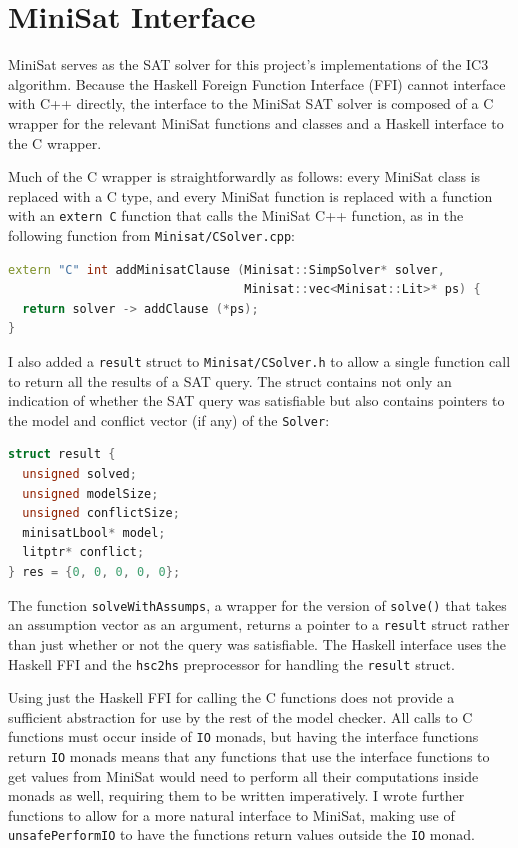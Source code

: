 \documentclass[12pt,a4paper,twoside,openright]{report}
\begin{document}
{\section{MiniSat Interface}
\label{impl:minisat}

MiniSat serves as the SAT solver for this project's implementations of the IC3 algorithm.
Because the Haskell Foreign Function Interface (FFI) cannot interface with C++ directly,
the interface to the MiniSat SAT solver is composed of a C wrapper for the relevant
MiniSat functions and classes and a Haskell interface to the C wrapper.

Much of the C wrapper is straightforwardly as follows:
every MiniSat class is replaced with a C
type, and every MiniSat function is replaced with a function with an \verb,extern C, function that
calls the MiniSat C++ function, as in the following function
from \verb,Minisat/CSolver.cpp,:
\begin{lstlisting}[language = C++]
extern "C" int addMinisatClause (Minisat::SimpSolver* solver,
                                 Minisat::vec<Minisat::Lit>* ps) {
  return solver -> addClause (*ps);
}
\end{lstlisting}

I also added a \verb,result, struct to \verb,Minisat/CSolver.h, to
allow a single function call to return
all the results of a SAT query. The struct contains not only an indication of
whether the SAT query was satisfiable but also contains pointers to the model and conflict vector (if any) of the \verb,Solver,:
\begin{lstlisting}[language=C]
struct result {
  unsigned solved;
  unsigned modelSize;
  unsigned conflictSize;
  minisatLbool* model;
  litptr* conflict;
} res = {0, 0, 0, 0, 0};
\end{lstlisting}

The function \verb,solveWithAssumps,, a wrapper for the version of \verb,solve(),
that takes an assumption vector as an argument, returns a pointer to a
\verb,result, struct rather than just whether or not the query was satisfiable.
The Haskell interface uses the Haskell FFI and the \verb,hsc2hs, preprocessor
for handling the \verb,result, struct.

Using just the Haskell FFI for calling the C functions does not provide a
sufficient abstraction for use by the rest of the model checker. All
calls to C functions must occur inside of \verb,IO, monads, but having
the interface functions return \verb,IO, monads means that any functions
that use the interface functions to get values from MiniSat would need to
perform all their computations inside monads as well, requiring them to
be written imperatively.
I wrote further functions to allow for a more natural interface to MiniSat,
making use of \verb,unsafePerformIO, to have the functions return
values outside the \verb,IO, monad.

}
\end{document}
